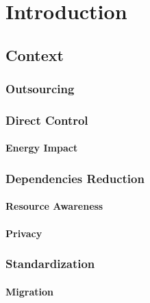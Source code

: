 \chapter{Introduction}
\label{cha:introduction}

\section{Context}
\label{sec:introduction_context}

\subsection{Outsourcing}
\label{subsec:introduction_context_outsourcing}

\subsection{Direct Control}
\label{subsec:introduction_context_direct_control}

\subsubsection{Energy Impact}
\label{subsubsec:introduction_context_direct_control_energy_impact}

\subsection{Dependencies Reduction}
\label{subsec:introduction_solutions_dependencies_reduction}

\subsubsection{Resource Awareness}
\label{subsubsec:introduction_context_direct_control_resource_awareness}

\subsubsection{Privacy}
\label{subsubsec:introduction_context_direct_control_privacy}

\subsection{Standardization}
\label{subsec:introduction_context_standardization}

\subsubsection{Migration}
\label{subsubsec:introduction_context_standardization_migration}

